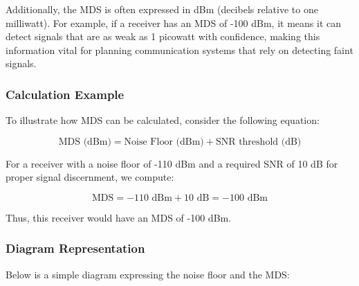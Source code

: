 Additionally, the MDS is often expressed in dBm (decibels relative to one milliwatt). For example, if a receiver has an MDS of -100 dBm, it means it can detect signals that are as weak as 1 picowatt with confidence, making this information vital for planning communication systems that rely on detecting faint signals.

\subsubsection{Calculation Example}

To illustrate how MDS can be calculated, consider the following equation:

\[
\text{MDS (dBm)} = \text{Noise Floor (dBm)} + \text{SNR threshold (dB)}
\]

For a receiver with a noise floor of -110 dBm and a required SNR of 10 dB for proper signal discernment, we compute:

\[
\text{MDS} = -110 \text{ dBm} + 10 \text{ dB} = -100 \text{ dBm}
\]

Thus, this receiver would have an MDS of -100 dBm. 

\subsubsection{Diagram Representation}

Below is a simple diagram expressing the noise floor and the MDS:

\begin{center}
\end{center}

